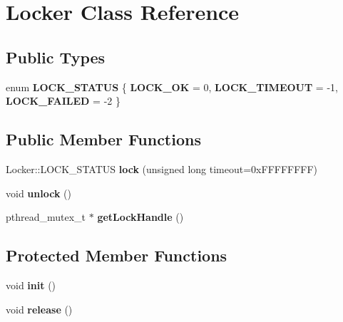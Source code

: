 \hypertarget{class_locker}{}\section{Locker Class Reference}
\label{class_locker}
\subsection*{Public Types}
\begin{DoxyCompactItemize}
\item 
enum {\bfseries L\+O\+C\+K\+\_\+\+S\+T\+A\+T\+US} \{ {\bfseries L\+O\+C\+K\+\_\+\+OK} = 0, 
{\bfseries L\+O\+C\+K\+\_\+\+T\+I\+M\+E\+O\+UT} = -\/1, 
{\bfseries L\+O\+C\+K\+\_\+\+F\+A\+I\+L\+ED} = -\/2
 \}\hypertarget{class_locker_a9041a321dd3a61e8f4001bff198c1fba}{}\label{class_locker_a9041a321dd3a61e8f4001bff198c1fba}

\end{DoxyCompactItemize}
\subsection*{Public Member Functions}
\begin{DoxyCompactItemize}
\item 
Locker\+::\+L\+O\+C\+K\+\_\+\+S\+T\+A\+T\+US {\bfseries lock} (unsigned long timeout=0x\+F\+F\+F\+F\+F\+F\+F\+F)\hypertarget{class_locker_aabec65f1478f070c51c320ea202e9823}{}\label{class_locker_aabec65f1478f070c51c320ea202e9823}

\item 
void {\bfseries unlock} ()\hypertarget{class_locker_aafb16768c3b3a911002622b886000882}{}\label{class_locker_aafb16768c3b3a911002622b886000882}

\item 
pthread\+\_\+mutex\+\_\+t $\ast$ {\bfseries get\+Lock\+Handle} ()\hypertarget{class_locker_aed8d8d8cd1b14246396c8739ea4396a2}{}\label{class_locker_aed8d8d8cd1b14246396c8739ea4396a2}

\end{DoxyCompactItemize}
\subsection*{Protected Member Functions}
\begin{DoxyCompactItemize}
\item 
void {\bfseries init} ()\hypertarget{class_locker_a5eb30006ff65236fae5f8e67d2fe007c}{}\label{class_locker_a5eb30006ff65236fae5f8e67d2fe007c}

\item 
void {\bfseries release} ()\hypertarget{class_locker_a4780a62c558c6460fc34fcd935847934}{}\label{class_locker_a4780a62c558c6460fc34fcd935847934}

\end{DoxyCompactItemize}

